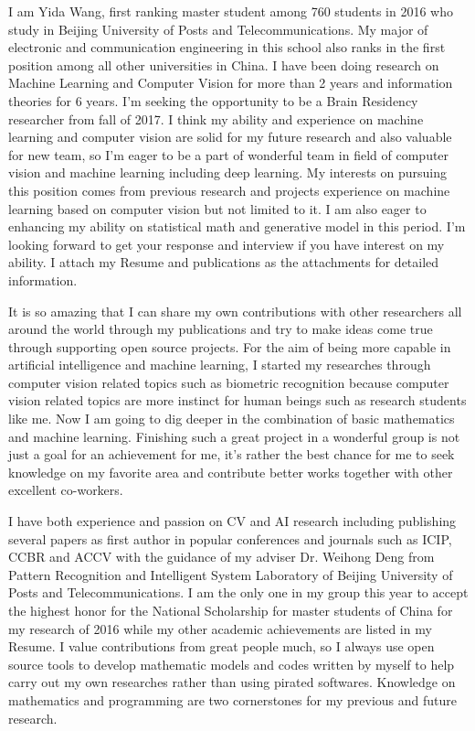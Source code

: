\documentclass[11pt, a4paper]{awesome-cv} %
\begin{document}
\makecvheader %



I am Yida Wang, first ranking master student among 760 students in 2016 who study in Beijing University of Posts and Telecommunications. My major of electronic and communication engineering in this school also ranks in the first position among all other universities in China. I have been doing research on Machine Learning and Computer Vision for more than 2 years and information theories for 6 years. I'm seeking the opportunity to be a Brain Residency researcher from fall of 2017. I think my ability and experience on machine learning and computer vision are solid for my future research and also valuable for new team, so I'm eager to be a part of wonderful team in field of computer vision and machine learning including deep learning. My interests on pursuing this position comes from previous research and projects experience on machine learning based on computer vision but not limited to it. I am also eager to enhancing my ability on statistical math and generative model in this period. I'm looking forward to get your response and interview if you have interest on my ability. I attach my Resume and publications as the attachments for detailed information.

It is so amazing that I can share my own contributions with other researchers all around the world through my publications and try to make ideas come true through supporting open source projects. For the aim of being more capable in artificial intelligence and machine learning, I started my researches through computer vision related topics such as biometric recognition because computer vision related topics are more instinct for human beings such as research students like me. Now I am going to dig deeper in the combination of basic mathematics and machine learning. Finishing such a great project in a wonderful group is not just a goal for an achievement for me, it's rather the best chance for me to seek knowledge on my favorite area and contribute better works together with other excellent co-workers.


I have both experience and passion on CV and AI research including publishing several papers as first author in popular conferences and journals such as ICIP, CCBR and ACCV with the guidance of my adviser Dr. Weihong Deng from Pattern Recognition and Intelligent System Laboratory of Beijing University of Posts and Telecommunications. I am the only one in my group this year to accept the highest honor for the National Scholarship for master students of China for my research of 2016 while my other academic achievements are listed in my Resume. I value contributions from great people much, so I always use open source tools to develop mathematic models and codes written by myself to help carry out my own researches rather than using pirated softwares. Knowledge on mathematics and programming are two cornerstones for my previous and future research.
\end{document}
